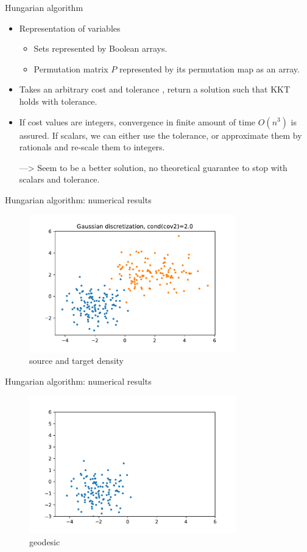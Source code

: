 \documentclass{beamer}
\begin{document}
\begin{frame}{Hungarian algorithm}
    \begin{itemize}
        \item Representation of variables
        \begin{itemize}
            \item Sets represented by Boolean arrays.
            \item Permutation matrix $P$ represented by its permutation map as an array.
        \end{itemize}
        \item Takes an arbitrary cost and tolerance , return a solution such that KKT holds with tolerance. 
        \item If cost values are integers, convergence in finite amount of time $O(n^3)$ is assured.
        If scalars, we can either use the tolerance, or approximate them by rationals and re-scale them to integers.
        
        ––> Seem to be a better solution, no theoretical guarantee to stop with scalars and tolerance.
    \end{itemize}
\end{frame}
\begin{frame}{Hungarian algorithm: numerical results}
\begin{figure}
    \centering
    \includegraphics[width=0.8\textwidth]{graphics/hungarian_mu_nu.pdf}
    \caption{source and target density}
    \label{fig:nu}
\end{figure}
\end{frame}
\begin{frame}{Hungarian algorithm: numerical results}
\begin{figure}
    \centering
    \includegraphics[width=0.8\textwidth]{graphics/hungarian_geodesic0.pdf}
    \caption{geodesic}
    \label{fig:nu}
\end{figure}
\end{frame}
\end{document}
